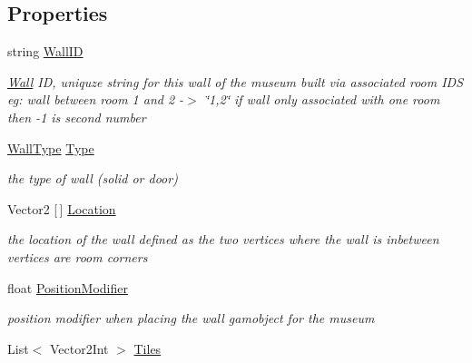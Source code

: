 \subsection*{Properties}
\begin{DoxyCompactItemize}
\item 
string \mbox{\hyperlink{class_wall_a44f8ec4294e23148d51bcd33206a78c7}{Wall\+ID}}
\begin{DoxyCompactList}\small\item\em \mbox{\hyperlink{class_wall}{Wall}} ID, uniquze string for this wall of the museum built via associated room I\+DS eg\+: wall between room 1 and 2 -\/$>$ \char`\"{}1,2\char`\"{} if wall only associated with one room then -\/1 is second number \end{DoxyCompactList}\item 
\mbox{\hyperlink{class_wall_a1366d94ac70428624a6703d7db89638d}{Wall\+Type}} \mbox{\hyperlink{class_wall_ade4c1924f35fd33637a3cdfa31566af0}{Type}}
\begin{DoxyCompactList}\small\item\em the type of wall (solid or door) \end{DoxyCompactList}\item 
Vector2 \mbox{[}$\,$\mbox{]} \mbox{\hyperlink{class_wall_ac7769d0a497da7e7ae3a11c813645b7a}{Location}}
\begin{DoxyCompactList}\small\item\em the location of the wall defined as the two vertices where the wall is inbetween vertices are room corners \end{DoxyCompactList}\item 
float \mbox{\hyperlink{class_wall_ae056b7b9068536491c1ac441a25824a0}{Position\+Modifier}}
\begin{DoxyCompactList}\small\item\em position modifier when placing the wall gamobject for the museum \end{DoxyCompactList}\item 
List$<$ Vector2\+Int $>$ \mbox{\hyperlink{class_wall_a1e5fab93aa7e8676dd65a61a26b28513}{Tiles}}

\end{DoxyCompactItemize}
